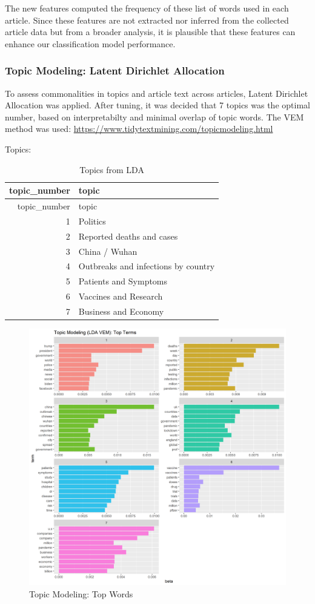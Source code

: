 \documentclass[
]{article}
\begin{document}
The new features computed the frequency of these list of words used in
each article. Since these features are not extracted nor inferred from
the collected article data but from a broader analysis, it is plausible
that these features can enhance our classification model performance.

\hypertarget{topic-modeling-latent-dirichlet-allocation}{%
\subsubsection{Topic Modeling: Latent Dirichlet
Allocation}\label{topic-modeling-latent-dirichlet-allocation}}

To assess commonalities in topics and article text across articles,
Latent Dirichlet Allocation was applied. After tuning, it was decided
that 7 topics was the optimal number, based on interpretabilty and
minimal overlap of topic words. The VEM method was used:
\url{https://www.tidytextmining.com/topicmodeling.html}

Topics:

\begin{longtable}[]{@{}rl@{}}
\caption{Topics from LDA}\tabularnewline
\toprule
topic\_number & topic\tabularnewline
\midrule
\endfirsthead
\toprule
topic\_number & topic\tabularnewline
\midrule
\endhead
1 & Politics\tabularnewline
2 & Reported deaths and cases\tabularnewline
3 & China / Wuhan\tabularnewline
4 & Outbreaks and infections by country\tabularnewline
5 & Patients and Symptoms\tabularnewline
6 & Vaccines and Research\tabularnewline
7 & Business and Economy\tabularnewline
\bottomrule
\end{longtable}

\begin{figure}
\centering
\includegraphics{../figures/lda_top_terms.png}
\caption{Topic Modeling: Top Words}
\end{figure}
\end{document}
